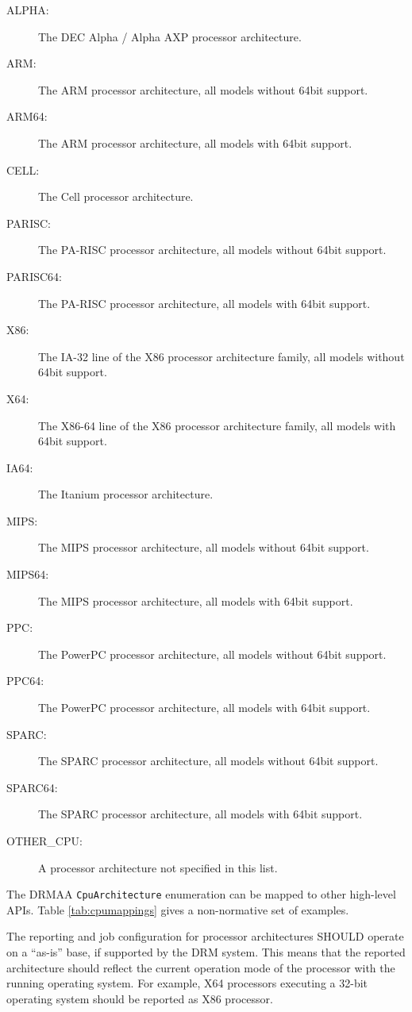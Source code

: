 \documentclass{article}
\newcommand{\h}[1]{\lstinline|#1|}
\begin{document}
\begin{description}
\item[ALPHA:] The DEC Alpha / Alpha AXP processor architecture.
\item[ARM:] The ARM processor architecture, all models without 64bit support.
\item[ARM64:] The ARM processor architecture, all models with 64bit support.
\item[CELL:] The Cell processor architecture.
\item[PARISC:] The PA-RISC processor architecture, all models without 64bit support.
\item[PARISC64:] The PA-RISC processor architecture, all models with 64bit support.
\item[X86:] The IA-32 line of the X86 processor architecture family, all models without 64bit support.
\item[X64:] The X86-64 line of the X86 processor architecture family, all models with 64bit support.
\item[IA64:] The Itanium processor architecture.
\item[MIPS:] The MIPS processor architecture, all models without 64bit support.
\item[MIPS64:] The MIPS processor architecture, all models with 64bit support.
\item[PPC:] The PowerPC processor architecture, all models without 64bit support.
\item[PPC64:] The PowerPC processor architecture, all models with 64bit support.
\item[SPARC:] The SPARC processor architecture, all models without 64bit support.
\item[SPARC64:] The SPARC processor architecture, all models with 64bit support.
\item[OTHER\_CPU:] A processor architecture not specified in this list.
\end{description}

The DRMAA \h{CpuArchitecture} enumeration can be mapped to other high-level APIs. Table \ref{tab:cpumappings} gives a non-normative set of examples.

The reporting and job configuration for processor architectures SHOULD operate on a \enquote{as-is} base, if supported by the DRM system. This means that the reported architecture should reflect the current operation mode of the processor with the running operating system. For example, X64 processors executing a 32-bit operating system should be reported as X86 processor.   
\end{document}
